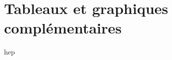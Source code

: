 \documentclass[main.tex]{subfiles}
\begin{document}
\chapter{Tableaux et graphiques complémentaires}
hep
\end{document}
